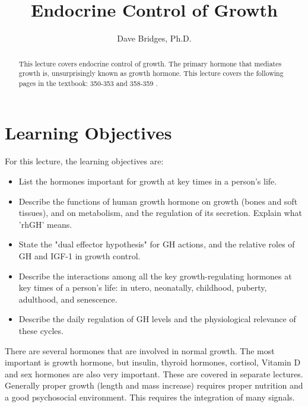 \documentclass{tufte-handout}
\title{Endocrine Control of Growth}
\author{Dave Bridges, Ph.D.}
\begin{document}
\maketitle%

\begin{abstract}
\noindent This lecture covers endocrine control of growth.  The primary hormone that mediates growth is, unsurprisingly known as growth hormone.  This lecture covers the following pages in the textbook: 350-353 and 358-359 \cite{Widmaier2013}.
\end{abstract}

\tableofcontents

\pagebreak

\section{Learning Objectives}
For this lecture, the learning objectives are:
\begin{itemize}
\item List the hormones important for growth at key times in a person's life.
\item Describe the functions of human growth hormone on growth (bones and soft tissues), and on metabolism, and the regulation of its secretion.  Explain what 'rhGH' means.
\item State the "dual effector hypothesis" for GH actions, and the relative roles of GH and IGF-1 in growth control. 
\item Describe the interactions among all the key growth-regulating hormones at key times of a person's life: in utero, neonatally, childhood, puberty, adulthood, and senescence.
\item Describe the daily regulation of GH levels and the physiological relevance of these cycles.

\end{itemize}

\pagebreak

There are several hormones that are involved in normal growth.  The most important is growth hormone, but insulin, thyroid hormones, cortisol, Vitamin D and sex hormones are also very important.  These are covered in separate lectures.  Generally proper growth (length and mass increase) requires proper nutrition and a good psychosocial environment.   This requires the integration of many signals.
\end{document}
